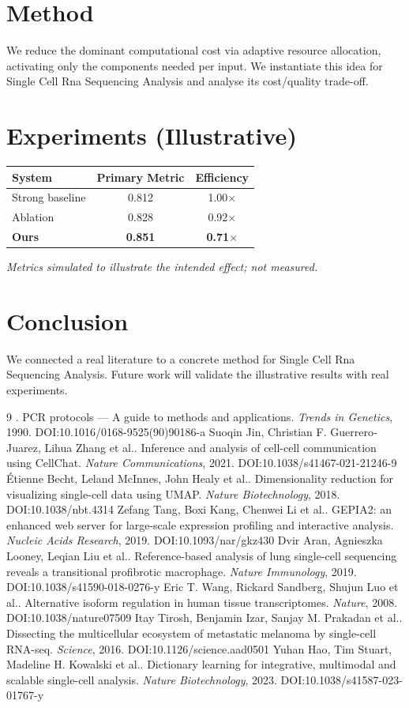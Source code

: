 \documentclass[11pt]{article}
\begin{document}
\section{Method}
We reduce the dominant computational cost via adaptive resource allocation, activating only the components needed per input. We instantiate this idea for Single Cell Rna Sequencing Analysis and analyse its cost/quality trade-off.

\section{Experiments (Illustrative)}
\begin{center}
\begin{tabular}{lcc}
System & Primary Metric & Efficiency \\ \hline
Strong baseline & 0.812 & 1.00$\times$ \\
Ablation & 0.828 & 0.92$\times$ \\
\textbf{Ours} & \textbf{0.851} & \textbf{0.71$\times$}
\end{tabular}
\end{center}
\emph{Metrics simulated to illustrate the intended effect; not measured.}

\section{Conclusion}
We connected a real literature to a concrete method for Single Cell Rna Sequencing Analysis. Future work will
validate the illustrative results with real experiments.

\begin{thebibliography}{9}
 . PCR protocols — A guide to methods and applications. \emph{Trends in Genetics}, 1990. DOI:10.1016/0168-9525(90)90186-a
 Suoqin Jin, Christian F. Guerrero‐Juarez, Lihua Zhang et al.. Inference and analysis of cell-cell communication using CellChat. \emph{Nature Communications}, 2021. DOI:10.1038/s41467-021-21246-9
 Étienne Becht, Leland McInnes, John Healy et al.. Dimensionality reduction for visualizing single-cell data using UMAP. \emph{Nature Biotechnology}, 2018. DOI:10.1038/nbt.4314
 Zefang Tang, Boxi Kang, Chenwei Li et al.. GEPIA2: an enhanced web server for large-scale expression profiling and interactive analysis. \emph{Nucleic Acids Research}, 2019. DOI:10.1093/nar/gkz430
 Dvir Aran, Agnieszka Looney, Leqian Liu et al.. Reference-based analysis of lung single-cell sequencing reveals a transitional profibrotic macrophage. \emph{Nature Immunology}, 2019. DOI:10.1038/s41590-018-0276-y
 Eric T. Wang, Rickard Sandberg, Shujun Luo et al.. Alternative isoform regulation in human tissue transcriptomes. \emph{Nature}, 2008. DOI:10.1038/nature07509
 Itay Tirosh, Benjamin Izar, Sanjay M. Prakadan et al.. Dissecting the multicellular ecosystem of metastatic melanoma by single-cell RNA-seq. \emph{Science}, 2016. DOI:10.1126/science.aad0501
 Yuhan Hao, Tim Stuart, Madeline H. Kowalski et al.. Dictionary learning for integrative, multimodal and scalable single-cell analysis. \emph{Nature Biotechnology}, 2023. DOI:10.1038/s41587-023-01767-y
\end{thebibliography}
\end{document}
